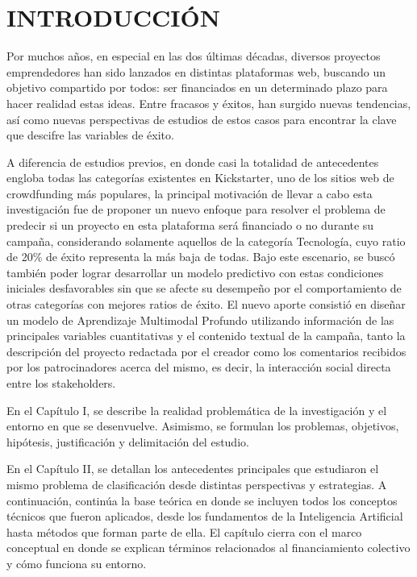 
\chapter*{INTRODUCCIÓN}

Por muchos años, en especial en las dos últimas décadas, diversos proyectos emprendedores han sido lanzados en distintas plataformas web, buscando un objetivo compartido por todos: ser financiados en un determinado plazo para hacer realidad estas ideas. Entre fracasos y éxitos, han surgido nuevas tendencias, así como nuevas perspectivas de estudios de estos casos para encontrar la clave que descifre las variables de éxito.

A diferencia de estudios previos, en donde casi la totalidad de antecedentes engloba todas las categorías existentes en Kickstarter, uno de los sitios web de crowdfunding más populares, la principal motivación de llevar a cabo esta investigación fue de proponer un nuevo enfoque para resolver el problema de predecir si un proyecto en esta plataforma será financiado o no durante su campaña, considerando solamente aquellos de la categoría Tecnología, cuyo ratio de 20\% de éxito representa la más baja de todas. Bajo este escenario, se buscó también poder lograr desarrollar un modelo predictivo con estas condiciones iniciales desfavorables sin que se afecte su desempeño por el comportamiento de otras categorías con mejores ratios de éxito. El nuevo aporte consistió en diseñar un modelo de Aprendizaje Multimodal Profundo utilizando información de las principales variables cuantitativas y el contenido textual de la campaña, tanto la descripción del proyecto redactada por el creador como los comentarios recibidos por los patrocinadores acerca del mismo, es decir, la interacción social directa entre los stakeholders.

En el Capítulo I, se describe la realidad problemática de la investigación y el entorno en que se desenvuelve. Asimismo, se formulan los problemas, objetivos, hipótesis, justificación y delimitación del estudio.

En el Capítulo II, se detallan los antecedentes principales que estudiaron el mismo problema de clasificación desde distintas perspectivas y estrategias. A continuación, continúa la base teórica en donde se incluyen todos los conceptos técnicos que fueron aplicados, desde los fundamentos de la Inteligencia Artificial hasta métodos que forman parte de ella. El capítulo cierra con el marco conceptual en donde se explican términos relacionados al financiamiento colectivo y cómo funciona su entorno.


